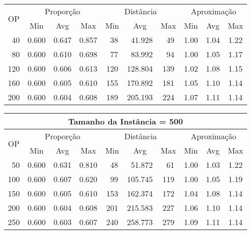 \begin{table}[!tb]
\begin{center}
{\begin{tabular}{|c|c|c|c|c|c|c|c|c|c|}
\multirow{2}{*}{OP} & \multicolumn{3}{c|}{Proporção} & \multicolumn{3}{c|}{Distância} & \multicolumn{3}{c|}{Aproximação}   \\ \cline{2-10}
                    & Min       & Avg      & Max      & Min      & Avg      & Max     & Min     & Avg    & Max             \\ \hline
~40                 & 0.600     & 0.647    & 0.857    & ~38      & ~41.928  & ~49     & 1.00    & 1.04   & 1.22            \\ \hline
~80                 & 0.600     & 0.610    & 0.698    & ~77      & ~83.992  & ~94     & 1.00    & 1.05   & 1.17            \\ \hline
120                 & 0.600     & 0.606    & 0.613    & 120      & 128.804  & 139     & 1.02    & 1.08   & 1.15            \\ \hline
160                 & 0.600     & 0.605    & 0.610    & 155      & 170.892  & 181     & 1.05    & 1.10   & 1.14            \\ \hline
200                 & 0.600     & 0.604    & 0.608    & 189      & 205.193  & 224     & 1.07    & 1.11   & 1.14            \\ \hline
\end{tabular}%
\vspace{5pt}
\begin{tabular}{|c|c|c|c|c|c|c|c|c|c|}
\hline
\multicolumn{10}{|c|}{\bf Tamanho da Instância = 500}                                                                          \\ \hline
\multirow{2}{*}{OP} & \multicolumn{3}{c|}{Proporção} & \multicolumn{3}{c|}{Distância} & \multicolumn{3}{c|}{Aproximação}   \\ \cline{2-10}
                    & Min       & Avg      & Max      & Min      & Avg      & Max     & Min     & Avg    & Max             \\ \hline
~50                 & 0.600     & 0.631    & 0.810    & ~48      & ~51.872  & ~61     & 1.00    & 1.03   & 1.22            \\ \hline
100                 & 0.600     & 0.607    & 0.620    & ~99      & 105.745  & 119     & 1.00    & 1.05   & 1.19            \\ \hline
150                 & 0.600     & 0.605    & 0.610    & 153      & 162.374  & 172     & 1.04    & 1.08   & 1.14            \\ \hline
200                 & 0.600     & 0.604    & 0.608    & 201      & 215.583  & 227     & 1.06    & 1.10   & 1.14            \\ \hline
250                 & 0.600     & 0.603    & 0.607    & 240      & 258.773  & 279     & 1.09    & 1.11   & 1.14            \\ \hline
\end{tabular}%
}
\end{center}
\end{table}
